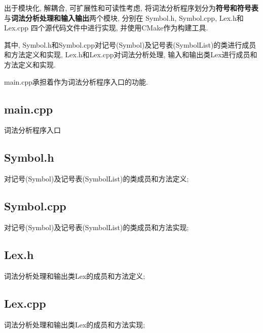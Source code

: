 出于模块化, 解耦合, 可扩展性和可读性考虑, 将词法分析程序划分为\textbf{符号和符号表}
与\textbf{词法分析处理和输入输出}两个模块, 分别在 Symbol.h, Symbol.cpp, Lex.h和Lex.cpp
四个源代码文件中进行实现, 并使用CMake作为构建工具.

其中, Symbol.h和Symbol.cpp对记号(Symbol)及记号表(SymbolList)的类进行成员和方法定义和实现,
 Lex.h和Lex.cpp对词法分析处理, 输入和输出类Lex进行成员和方法定义和实现.

main.cpp承担着作为词法分析程序入口的功能.

\subsection{main.cpp}
词法分析程序入口

\subsection{Symbol.h}
对记号(Symbol)及记号表(SymbolList)的类成员和方法定义;

\subsection{Symbol.cpp}
对记号(Symbol)及记号表(SymbolList)的类成员和方法实现;

\subsection{Lex.h}
词法分析处理和输出类Lex的成员和方法定义;

\subsection{Lex.cpp}
词法分析处理和输出类Lex的成员和方法实现;

